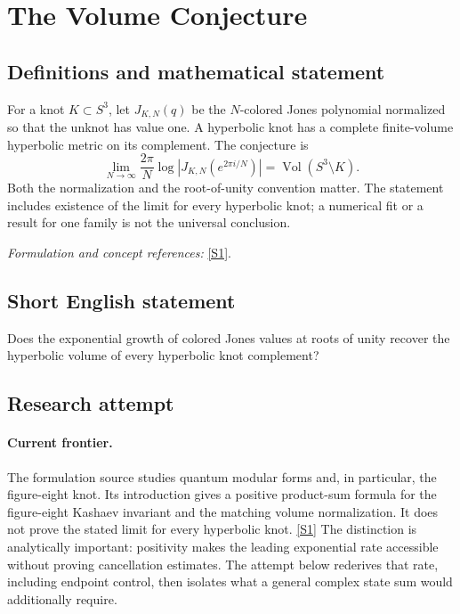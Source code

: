 \documentclass[11pt,a4paper]{article}
\newcommand{\sref}[2]{\hyperlink{source:#1:#2}{[S#2]}}
\newif\ifshowcatalogue
\newcommand{\cataloguescope}[1]{\ifshowcatalogue
 \paragraph{Exact scope in the supplied catalogue.}
 \begin{quote}\small #1\end{quote}\fi}
\numberwithin{equation}{section}
\begin{document}
\setcounter{section}{0}
\clearpage
\section*{\texorpdfstring{The Volume Conjecture}{The Volume Conjecture}}\label{statement}
\subsection{Definitions and mathematical statement}
For a knot $K\subset S^3$, let $J_{K,N}(q)$ be the $N$-colored Jones polynomial normalized so that the unknot has value one. A hyperbolic knot has a complete finite-volume hyperbolic metric on its complement. The conjecture is
\[
 \lim_{N\to\infty}\frac{2\pi}{N}\log\left|J_{K,N}(e^{2\pi i/N})\right|
 =\operatorname{Vol}(S^3\setminus K).
\]
Both the normalization and the root-of-unity convention matter. The statement includes existence of the limit for every hyperbolic knot; a numerical fit or a result for one family is not the universal conclusion.
\par\smallskip\textit{Formulation and concept references:} \sref{statement}{1}.
\cataloguescope{Prove or disprove that for every hyperbolic knot K in S\textasciicircum{}3, the limit as N tends to infinity of (2*pi/N) log|J\_\{K,N\}(exp(2*pi*i/N))| equals the hyperbolic volume of S\textasciicircum{}3 minus K, using the standard normalized N-colored Jones polynomial.}
\subsection{Short English statement}
Does the exponential growth of colored Jones values at roots of unity recover the hyperbolic volume of every hyperbolic knot complement?
\subsection{Research attempt}

\paragraph{Current frontier.}
The formulation source studies quantum modular forms and, in particular,
the figure-eight knot.  Its introduction gives a positive product-sum
formula for the figure-eight Kashaev invariant and the matching volume
normalization.  It does not prove the stated limit for every hyperbolic
knot. \sref{statement}{1}
The distinction is analytically important: positivity makes the leading
exponential rate accessible without proving cancellation estimates.
The attempt below rederives that rate, including endpoint control, then
isolates what a general complex state sum would additionally require.
\end{document}
